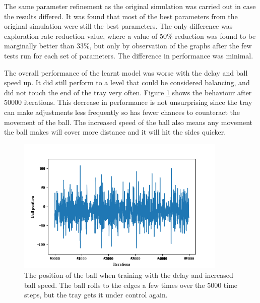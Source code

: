 \documentclass[12pt,a4paper]{article}
\begin{document}
The same parameter refinement as the original simulation was carried out in case the results differed. It was found that most of the best parameters from the original simulation were still the best parameters. The only difference was exploration rate reduction value, where a value of 50\% reduction was found to be marginally better than 33\%, but only by observation of the graphs after the few tests run for each set of parameters. The difference in performance was minimal.

The overall performance of the learnt model was worse with the delay and ball speed up. It did still perform to a level that could be considered balancing, and did not touch the end of the tray very often. Figure \ref{refined_sim_general} shows the behaviour after 50000 iterations. This decrease in performance is not unsurprising since the tray can make adjustments less frequently so has fewer chances to counteract the movement of the ball. The increased speed of the ball also means any movement the ball makes will cover more distance and it will hit the sides quicker.

\begin{figure}[H]
	\centering
	\includegraphics[width=10cm]{195}
	\caption{The position of the ball when training with the delay and increased ball speed. The ball rolls to the edges a few times over the 5000 time steps, but the tray gets it under control again. }
	\label{refined_sim_general}
\end{figure}
\end{document}
